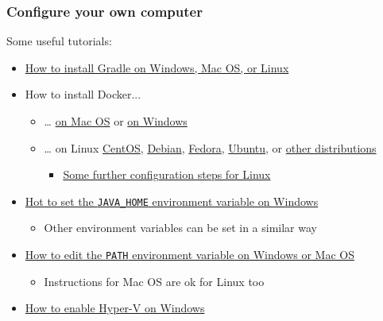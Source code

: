 \documentclass[handout]{beamer}\mode<presentation>{\usetheme{AMSCesenaBleu}}
\begin{document}
\begin{frame}
\frametitle{Configure your own computer}

	Some useful tutorials:
	\begin{itemize} 
		
		\item \href{https://docs.gradle.org/current/userguide/installation.html\#installing_manually}{How to install Gradle on Windows, Mac OS, or Linux}
		
		\item How to install Docker...
		\begin{itemize}
			\item \ldots{} \href{https://docs.docker.com/docker-for-mac/install/}{on Mac OS} or \href{https://docs.docker.com/docker-for-windows/install/}{on Windows}
			\item \ldots{} on Linux \href{https://docs.docker.com/install/linux/docker-ce/centos/}{CentOS}, \href{https://docs.docker.com/install/linux/docker-ce/debian/}{Debian}, \href{https://docs.docker.com/install/linux/docker-ce/fedora/}{Fedora}, \href{https://docs.docker.com/install/linux/docker-ce/ubuntu/}{Ubuntu}, or \href{https://docs.docker.com/install/linux/docker-ce/binaries/}{other distributions}
			\begin{itemize}
				\item \href{https://docs.docker.com/install/linux/linux-postinstall/}{Some further configuration steps for Linux}
			\end{itemize}
		\end{itemize}
		
		\item	 \href{https://confluence.atlassian.com/doc/setting-the-java_home-variable-in-windows-8895.html}{Hot to set the \texttt{JAVA\_HOME} environment variable on Windows}
		\begin{itemize}
			\item Other environment variables can be set in a similar way
		\end{itemize}
		
		\item \href{https://www.java.com/en/download/help/path.xml}{How to edit the \texttt{PATH} environment variable on Windows or Mac OS}
		\begin{itemize}
			\item Instructions for Mac OS are ok for Linux too
		\end{itemize}
	
		\item \href{https://docs.microsoft.com/it-it/virtualization/hyper-v-on-windows/quick-start/enable-hyper-v}{How to enable Hyper-V on Windows}
	

\end{itemize}
\end{frame}
\end{document}

